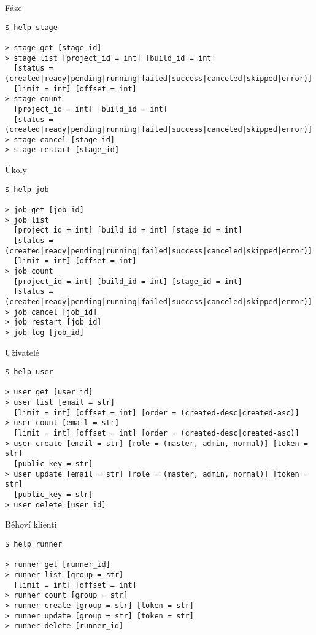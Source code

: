 {\begin{listing}[H]
\caption{Fáze}
\begin{verbatim}
$ help stage

> stage get [stage_id]
> stage list [project_id = int] [build_id = int]
  [status = (created|ready|pending|running|failed|success|canceled|skipped|error)]
  [limit = int] [offset = int]
> stage count
  [project_id = int] [build_id = int]
  [status = (created|ready|pending|running|failed|success|canceled|skipped|error)]
> stage cancel [stage_id]
> stage restart [stage_id]
\end{verbatim}
\end{listing}

\begin{listing}[H]
\caption{Úkoly}
\begin{verbatim}
$ help job

> job get [job_id]
> job list
  [project_id = int] [build_id = int] [stage_id = int]
  [status = (created|ready|pending|running|failed|success|canceled|skipped|error)]
  [limit = int] [offset = int]
> job count
  [project_id = int] [build_id = int] [stage_id = int]
  [status = (created|ready|pending|running|failed|success|canceled|skipped|error)]
> job cancel [job_id]
> job restart [job_id]
> job log [job_id]
\end{verbatim}
\end{listing}

\begin{listing}[H]
\caption{Uživatelé}
\begin{verbatim}
$ help user

> user get [user_id]
> user list [email = str]
  [limit = int] [offset = int] [order = (created-desc|created-asc)]
> user count [email = str]
  [limit = int] [offset = int] [order = (created-desc|created-asc)]
> user create [email = str] [role = (master, admin, normal)] [token = str]
  [public_key = str]
> user update [email = str] [role = (master, admin, normal)] [token = str]
  [public_key = str]
> user delete [user_id]
\end{verbatim}
\end{listing}

\begin{listing}[H]
\caption{Běhoví klienti}
\begin{verbatim}
$ help runner

> runner get [runner_id]
> runner list [group = str]
  [limit = int] [offset = int]
> runner count [group = str]
> runner create [group = str] [token = str]
> runner update [group = str] [token = str]
> runner delete [runner_id]
\end{verbatim}
\end{listing}
}

